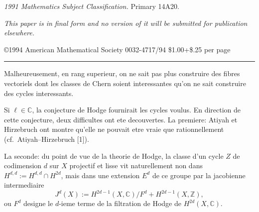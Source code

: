 \documentclass[11pt,a4paper]{article}
\theoremstyle{plain}
\theoremstyle{definition}
\newcommand{\Z}{\mathbb{Z}}
\newcommand{\C}{\mathbb{C}}
\begin{document}
\textit{1991 Mathematics Subject Classification.} Primary 14A20.

\textit{This paper is in final form and no version of it will be submitted for publication elsewhere.}

\noindent\copyright 1994 American Mathematical Society
\hfill 0032-4717/94 \$1.00+\$.25 per page

\vspace{0.5em}
\noindent\rule{\textwidth}{0.4pt}

Malheureusement, en rang superieur, on ne sait pas plus construire des fibres vectoriels dont les classes de Chern soient interessantes qu'on ne sait construire des cycles interessants.

Si $\ell \in \C$, la conjecture de Hodge fournirait les cycles voulus. En direction de cette conjecture, deux difficultes ont ete decouvertes. La premiere: Atiyah et Hirzebruch ont montre qu'elle ne pouvait etre vraie que rationnellement (cf.~Atiyah--Hirzebruch [1]).

La seconde: du point de vue de la theorie de Hodge, la classe d'un cycle $Z$ de codimension $d$ sur $X$ projectif et lisse vit naturellement non dans $H^{d,d} := H^{d,d} \cap H^{2d}$, mais dans une extension $E^d$ de ce groupe par la jacobienne intermediaire
$$
J^d(X) := H^{2d-1}(X, \C) / F^d + H^{2d-1}(X, \Z),
$$
ou $F^d$ designe le $d$-ieme terme de la filtration de Hodge de $H^{2d}(X, \C)$.
\end{document}
